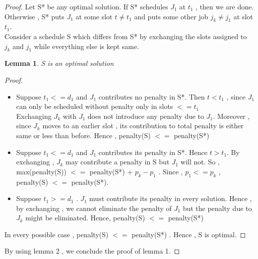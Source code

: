 \documentclass[11pt]{article}
\newtheorem{lemma}[theorem]{Lemma}
\begin{document}
\begin{proof}
Let S* be any optimal solution. If S* schedules $J_{1}$ at $t_1$ , then we are done.\\
Otherwise , S* puts $J_1$ at some slot $t \neq t_1$ and puts some other job $j_k \neq j_1$ at slot $t_1$. \\
Consider a schedule S which differs from S* by exchanging the slots assigned to $j_k$ and $j_1$ while everything else is kept same. 
\begin{lemma}
S is an optimal solution
\end{lemma}
\begin{proof}
\begin{itemize}
\item Suppose $t_1 <= d_1$ and $J_1$ contributes no penalty in S*. Then $t < t_1$ , since $J_1$ can only be scheduled without penalty only in slots $<= t_1$ \\
Exchanging $J_k$ with $J_1$ does not introduce any penalty due to $J_1$.
Moreover , since $J_k$ moves to an earlier slot , its contribution to total penalty is either same or less than before. Hence , penalty(S) $<=$ penalty(S*)
\item Suppose $t_1 <= d_1$ and $J_1$ contributes its penalty in S*. Hence $t > t_1$. By exchanging , $J_k$ may contribute a penalty in S but $J_1$ will not. So , max(penalty(S)) $<=$ penalty(S*) + $p_k - p_1$ . Since , $p_1 <= p_k$ , penalty(S) $<=$ penalty(S*). 
\item Suppose $t_1 >= d_1$ . $J_1$ must contribute its penalty in every solution. Hence , by exchanging , we cannot eliminate the penalty of $J_1$ but the penalty due to $J_k$ might be eliminated.
Hence, penalty(S) $<=$ penalty(S*) 
\end{itemize}
In every possible case , penalty(S) $<=$ penalty(S*) . Hence , S is optimal.
\end{proof}
By using lemma 2 , we conclude the proof of lemma 1.
\end{proof}
\end{document}
